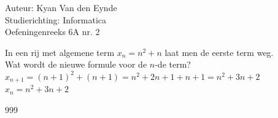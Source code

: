 \documentclass[a4paper]{article}
\begin{document}
  
\noindent \large Auteur: Kyan Van den Eynde \\
\noindent \large Studierichting: Informatica\\
\noindent \large Oefeningenreeks 6A nr. 2\\

\medskip

\normalsize

In een rij met algemene term $x_n = n^2 + n$ laat men de eerste term weg.\\

Wat wordt de nieuwe formule voor de $n$-de term?\\

$x_{n+1} = (n+1)^2+(n+1) = n^2 + 2n + 1 + n + 1 = n^2 + 3n + 2$\\

$x_n = n^2 + 3n + 2$\\

\begin{thebibliography}{999}
\end{thebibliography}
\end{document}
